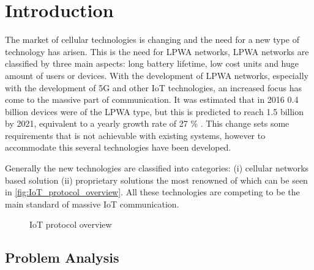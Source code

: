 \chapter{Introduction}\label{ch:Introduction}




The market of cellular technologies is changing and the need for a new type of technology has arisen. This is the need for \gls{LPWA} networks, \gls{LPWA} networks are classified by three main aspects: long battery lifetime, low cost units and huge amount of users or devices. With the development of \gls{LPWA} networks, especially with the development of 5G and other \gls{IoT} technologies, an increased focus has come to the massive part of communication. It was estimated that in 2016 0.4 billion devices were of the \gls{LPWA} type, but this is predicted to reach 1.5 billion by 2021, equivalent to a yearly growth rate of 27 \% \citep{mobi-report}. This change sets some requirements that is not achievable with existing systems, however to accommodate this several technologies have been developed.


Generally the new technologies are classified into categories: (i) cellular networks based solution (ii) proprietary solutions the most renowned of which can be seen in \autoref{fig:IoT_protocol_overview}. All these technologies are competing to be the main standard of massive \gls{IoT} communication. 

\begin{figure}[H]
\centering
\caption{\gls{IoT} protocol overview}
\label{fig:IoT_protocol_overview}
\end{figure}



\section{Problem Analysis}

